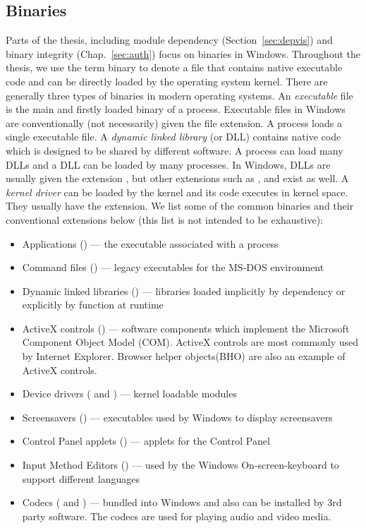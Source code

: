 \subsection{Binaries}
\label{sec:wi-binary}

Parts of the thesis, including module dependency (Section~\ref{sec:depvis})
and binary integrity (Chap.~\ref{sec:auth}) focus on binaries in Windows.
Throughout the thesis, we use the term binary to denote a file that contains
native executable code and can be directly loaded by the operating system kernel.
There are generally three types of binaries in modern operating systems.
An {\em executable} file is the main and firstly loaded binary of a process.
Executable files in Windows are conventionally (not necessarily)
given the  file extension.
A process loads a single executable file.
A {\em dynamic linked library} (or DLL) contains native code which is designed
to be shared by different software.
A process can load many DLLs and a DLL can be loaded by many processes.
In Windows, DLLs are usually given the extension , but other extensions
such as ,  and  exist as well.
A {\em kernel driver} can be loaded by the kernel and its code executes in kernel
space.
They usually have the  extension.
We list some of the common binaries and their conventional extensions below
(this list is not intended to be exhaustive):

\begin{itemize}
\item Applications () ---
the executable associated with a process
\item Command files () ---
legacy executables for the MS-DOS environment
\item Dynamic linked libraries () ---
libraries loaded implicitly by dependency or
explicitly by  function at runtime
\item ActiveX controls () ---
software components which
implement the Microsoft Component Object Model (COM). 
ActiveX controls are most commonly used by Internet Explorer.
Browser helper objects(BHO) are also
an example of ActiveX controls.
\item Device drivers ( and ) ---
kernel loadable modules
\item Screensavers () ---
executables used by Windows to display screensavers
\item Control Panel applets () ---
applets for the Control Panel
\item Input Method Editors () ---
used by the Windows On-screen-keyboard to support different languages
\item Codecs ( and ) ---
bundled into Windows and also can be installed by 3rd party software.
The codecs are used for playing audio and video media.
\end{itemize}

